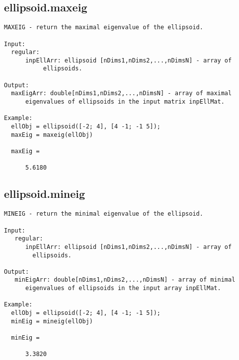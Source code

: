 \subsection{\texorpdfstring{ellipsoid.maxeig}{maxeig}}\label{method:ellipsoid.maxeig}
\begin{verbatim}
MAXEIG - return the maximal eigenvalue of the ellipsoid.

Input:
  regular:
      inpEllArr: ellipsoid [nDims1,nDims2,...,nDimsN] - array of
           ellipsoids.

Output:
  maxEigArr: double[nDims1,nDims2,...,nDimsN] - array of maximal
      eigenvalues of ellipsoids in the input matrix inpEllMat.

Example:
  ellObj = ellipsoid([-2; 4], [4 -1; -1 5]);
  maxEig = maxeig(ellObj)

  maxEig =

      5.6180
\end{verbatim}
\subsection{\texorpdfstring{ellipsoid.mineig}{mineig}}\label{method:ellipsoid.mineig}
\begin{verbatim}
MINEIG - return the minimal eigenvalue of the ellipsoid.

Input:
   regular:
      inpEllArr: ellipsoid [nDims1,nDims2,...,nDimsN] - array of
        ellipsoids.

Output:
   minEigArr: double[nDims1,nDims2,...,nDimsN] - array of minimal
      eigenvalues of ellipsoids in the input array inpEllMat.

Example:
  ellObj = ellipsoid([-2; 4], [4 -1; -1 5]);
  minEig = mineig(ellObj)

  minEig =

      3.3820
\end{verbatim}
